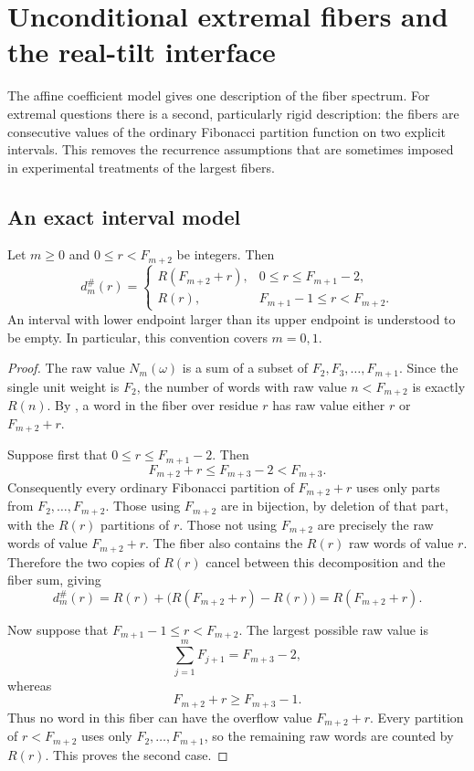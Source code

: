 \section{Unconditional extremal fibers and the real-tilt interface}
\label{sec:extremal-ldp}

The affine coefficient model gives one description of the fiber spectrum.  For
extremal questions there is a second, particularly rigid description: the
fibers are consecutive values of the ordinary Fibonacci partition function on
two explicit intervals.  This removes the recurrence assumptions that are
sometimes imposed in experimental treatments of the largest fibers.

\subsection{An exact interval model}

\begin{theorem}
\label{thm:fiber-partition-interval}
Let \(m\ge0\) and \(0\le r<F_{m+2}\) be integers.  Then
\[
 d_m^\#(r)=
 \begin{cases}
 R(F_{m+2}+r),&0\le r\le F_{m+1}-2,\\
 R(r),&F_{m+1}-1\le r<F_{m+2}.
 \end{cases}
\]
An interval with lower endpoint larger than its upper endpoint is understood
to be empty.  In particular, this convention covers \(m=0,1\).
\end{theorem}

\begin{proof}
The raw value \(N_m(\omega)\) is a sum of a subset of
\(F_2,F_3,\ldots,F_{m+1}\).  Since the single unit weight is \(F_2\), the
number of words with raw value \(n<F_{m+2}\) is exactly \(R(n)\).  By
, a word in the fiber over residue \(r\) has raw
value either \(r\) or \(F_{m+2}+r\).

Suppose first that \(0\le r\le F_{m+1}-2\).  Then
\[
 F_{m+2}+r\le F_{m+3}-2<F_{m+3}.
\]
Consequently every ordinary Fibonacci partition of \(F_{m+2}+r\) uses only
parts from \(F_2,\ldots,F_{m+2}\).  Those using \(F_{m+2}\) are in bijection,
by deletion of that part, with the \(R(r)\) partitions of \(r\).  Those not
using \(F_{m+2}\) are precisely the raw words of value \(F_{m+2}+r\).  The
fiber also contains the \(R(r)\) raw words of value \(r\).  Therefore the two
copies of \(R(r)\) cancel between this decomposition and the fiber sum, giving
\[
 d_m^\#(r)
 =R(r)+\bigl(R(F_{m+2}+r)-R(r)\bigr)
 =R(F_{m+2}+r).
\]

Now suppose that \(F_{m+1}-1\le r<F_{m+2}\).  The largest possible raw value is
\[
 \sum_{j=1}^m F_{j+1}=F_{m+3}-2,
\]
whereas
\[
 F_{m+2}+r\ge F_{m+3}-1.
\]
Thus no word in this fiber can have the overflow value \(F_{m+2}+r\).  Every
partition of \(r<F_{m+2}\) uses only \(F_2,\ldots,F_{m+1}\), so the remaining
raw words are counted by \(R(r)\).  This proves the second case.
\end{proof}

